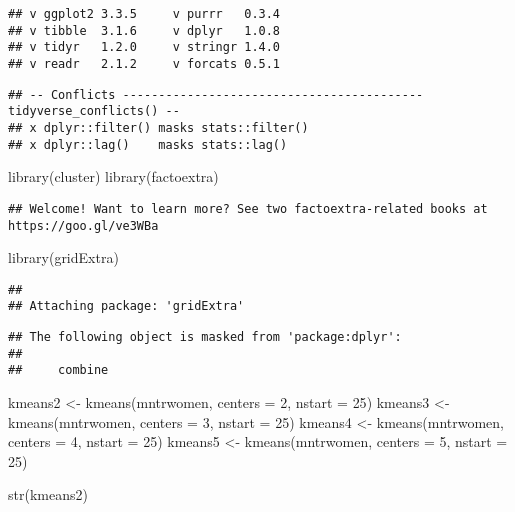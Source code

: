 \documentclass[
]{article}
\newenvironment{Shaded}{\begin{snugshade}}{\end{snugshade}}
\newcommand{\AttributeTok}[1]{\textcolor[rgb]{0.77,0.63,0.00}{#1}}
\newcommand{\DecValTok}[1]{\textcolor[rgb]{0.00,0.00,0.81}{#1}}
\newcommand{\FunctionTok}[1]{\textcolor[rgb]{0.00,0.00,0.00}{#1}}
\newcommand{\NormalTok}[1]{#1}
\newcommand{\OtherTok}[1]{\textcolor[rgb]{0.56,0.35,0.01}{#1}}
\begin{document}
\begin{verbatim}
## v ggplot2 3.3.5     v purrr   0.3.4
## v tibble  3.1.6     v dplyr   1.0.8
## v tidyr   1.2.0     v stringr 1.4.0
## v readr   2.1.2     v forcats 0.5.1
\end{verbatim}

\begin{verbatim}
## -- Conflicts ------------------------------------------ tidyverse_conflicts() --
## x dplyr::filter() masks stats::filter()
## x dplyr::lag()    masks stats::lag()
\end{verbatim}

\begin{Shaded}
\begin{Highlighting}[]
\FunctionTok{library}\NormalTok{(cluster)}
\FunctionTok{library}\NormalTok{(factoextra)}
\end{Highlighting}
\end{Shaded}

\begin{verbatim}
## Welcome! Want to learn more? See two factoextra-related books at https://goo.gl/ve3WBa
\end{verbatim}

\begin{Shaded}
\begin{Highlighting}[]
\FunctionTok{library}\NormalTok{(gridExtra)}
\end{Highlighting}
\end{Shaded}

\begin{verbatim}
## 
## Attaching package: 'gridExtra'
\end{verbatim}

\begin{verbatim}
## The following object is masked from 'package:dplyr':
## 
##     combine
\end{verbatim}

\begin{Shaded}
\begin{Highlighting}[]
\NormalTok{kmeans2 }\OtherTok{\textless{}{-}} \FunctionTok{kmeans}\NormalTok{(mntrwomen, }\AttributeTok{centers =} \DecValTok{2}\NormalTok{, }\AttributeTok{nstart =} \DecValTok{25}\NormalTok{)}
\NormalTok{kmeans3 }\OtherTok{\textless{}{-}} \FunctionTok{kmeans}\NormalTok{(mntrwomen, }\AttributeTok{centers =} \DecValTok{3}\NormalTok{, }\AttributeTok{nstart =} \DecValTok{25}\NormalTok{)}
\NormalTok{kmeans4 }\OtherTok{\textless{}{-}} \FunctionTok{kmeans}\NormalTok{(mntrwomen, }\AttributeTok{centers =} \DecValTok{4}\NormalTok{, }\AttributeTok{nstart =} \DecValTok{25}\NormalTok{)}
\NormalTok{kmeans5 }\OtherTok{\textless{}{-}} \FunctionTok{kmeans}\NormalTok{(mntrwomen, }\AttributeTok{centers =} \DecValTok{5}\NormalTok{, }\AttributeTok{nstart =} \DecValTok{25}\NormalTok{)}

\FunctionTok{str}\NormalTok{(kmeans2)}
\end{Highlighting}
\end{Shaded}
\end{document}
